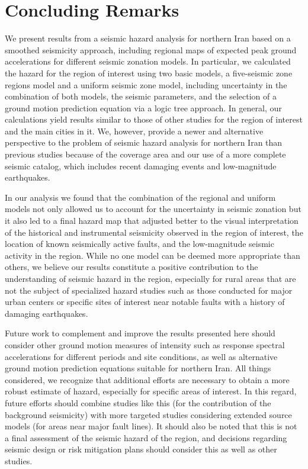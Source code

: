 
\section{Concluding Remarks}

We present results from a seismic hazard analysis for northern Iran based on a smoothed seismicity approach, including regional maps of expected peak ground accelerations for different seismic zonation models. In particular, we calculated the hazard for the region of interest using two basic models, a five-seismic zone regions model and a uniform seismic zone model, including uncertainty in the combination of both models, the seismic parameters, and the selection of a ground motion prediction equation via a logic tree approach. In general, our calculations yield results similar to those of other studies for the region of interest and the main cities in it. We, however, provide a newer and alternative perspective to the problem of seismic hazard analysis for northern Iran than previous studies because of the coverage area and our use of a more complete seismic catalog, which includes recent damaging events and low-magnitude earthquakes.

In our analysis we found that the combination of the regional and uniform models not only allowed us to account for the uncertainty in seismic zonation but it also led to a final hazard map that adjusted better to the visual interpretation of the historical and instrumental seismicity observed in the region of interest, the location of known seismically active faults, and the low-magnitude seismic activity in the region. While no one model can be deemed more appropriate than others, we believe our results constitute a positive contribution to the understanding of seismic hazard in the region, especially for rural areas that are not the subject of specialized hazard studies such as those conducted for major urban centers or specific sites of interest near notable faults with a history of damaging earthquakes.

Future work to complement and improve the results presented here should consider other ground motion measures of intensity such as response spectral accelerations for different periods and site conditions, as well as alternative ground motion prediction equations suitable for northern Iran. All things considered, we recognize that additional efforts are necessary to obtain a more robust estimate of hazard, especially for specific areas of interest. In this regard, future efforts should combine studies like this (for the contribution of the background seismicity) with more targeted studies considering extended source models (for areas near major fault lines). It should also be noted that this is not a final assessment of the seismic hazard of the region, and decisions regarding seismic design or risk mitigation plans should consider this as well as other studies.
